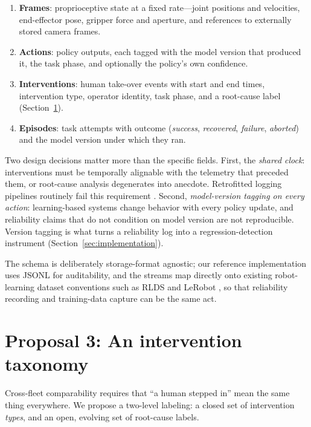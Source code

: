 \documentclass[11pt]{article}
\begin{document}
\begin{enumerate}
  \item \textbf{Frames}: proprioceptive state at a fixed rate---joint
  positions and velocities, end-effector pose, gripper force and aperture,
  and references to externally stored camera frames.
  \item \textbf{Actions}: policy outputs, each tagged with the model
  version that produced it, the task phase, and optionally the policy's
  own confidence.
  \item \textbf{Interventions}: human take-over events with start and end
  times, intervention type, operator identity, task phase, and a
  root-cause label (Section~\ref{sec:taxonomy}).
  \item \textbf{Episodes}: task attempts with outcome
  (\emph{success}, \emph{recovered}, \emph{failure}, \emph{aborted}) and
  the model version under which they ran.
\end{enumerate}

Two design decisions matter more than the specific fields. First, the
\emph{shared clock}: interventions must be temporally alignable with the
telemetry that preceded them, or root-cause analysis degenerates into
anecdote. Retrofitted logging pipelines routinely fail this requirement
\citep{roboticstomorrow2026webrtc}. Second, \emph{model-version tagging on
every action}: learning-based systems change behavior with every policy
update, and reliability claims that do not condition on model version are
not reproducible. Version tagging is what turns a reliability log into a
regression-detection instrument (Section~\ref{sec:implementation}).

The schema is deliberately storage-format agnostic; our reference
implementation uses JSONL for auditability, and the streams map directly
onto existing robot-learning dataset conventions such as RLDS and LeRobot
\citep{ramos2021rlds, cadene2024lerobot}, so that reliability recording and
training-data capture can be the same act.

\section{Proposal 3: An intervention taxonomy}
\label{sec:taxonomy}

Cross-fleet comparability requires that ``a human stepped in'' mean the
same thing everywhere. We propose a two-level labeling: a closed set of
intervention \emph{types}, and an open, evolving set of root-cause labels.
\end{document}
